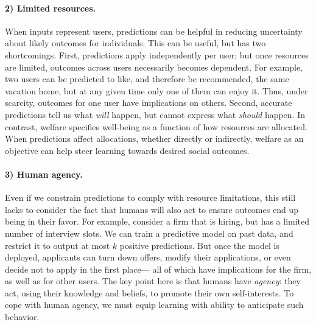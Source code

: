 {%

\paragraph{2) Limited resources.}
When inputs represent users,
predictions can be helpful in reducing uncertainty about likely outcomes
for individuals. 
This can be useful, but has two shortcomings.
First,
predictions apply independently per user;
but %
once resources are limited,
outcomes across users necessarily becomes dependent.
For example, two users can be predicted to like, and therefore be recommended, the same vacation home,
but at any given time only one of them can enjoy it.
Thus, under scarcity, outcomes for one user have implications on others.
Second, accurate predictions tell us what \emph{will} happen,
but cannot express what \emph{should} happen.
In contrast, 
welfare specifies well-being as a function of how resources are allocated.
When predictions affect allocations, whether directly or indirectly,
welfare as an objective can help steer learning towards desired social outcomes.
\squeeze


\paragraph{3) Human agency.}
Even if we constrain predictions to comply with resource limitations,
this still lacks to consider the fact that
humans will also act to ensure outcomes end up being in their favor.
For example, consider a firm that is hiring, but has a limited number of interview slots.
We can train a predictive model on past data, and restrict it to output at most $k$ positive predictions.
But once the model is deployed, applicants can turn down offers, modify their applications,
or even decide not to apply in the first place---%
all of which have implications for the firm, as well as for other users.
The key point here is that humans have \emph{agency}:
they act, using their knowledge and beliefs, to promote their own self-interests.
To cope with human agency, we must equip learning with ability to anticipate such behavior.

}
